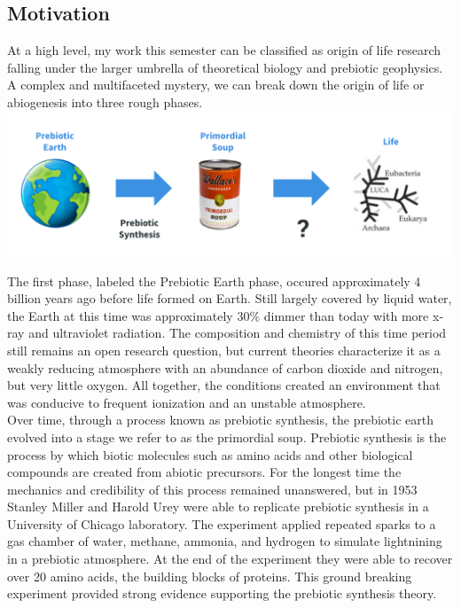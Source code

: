 \documentclass[11pt]{article}
\begin{document}
\subsection{Motivation}


At a high level, my work this semester can be classified as origin of life research  falling under the larger umbrella of theoretical biology and prebiotic geophysics.
A complex and multifaceted mystery, we can break down the origin of life or abiogenesis into three rough phases. \\

\includegraphics[width=\textwidth]{origin_of_life}

The first phase, labeled the Prebiotic Earth phase, occured approximately 4 billion years ago before life formed on Earth.
Still largely covered by liquid water, the Earth at this time was approximately 30\% dimmer than today with more x-ray and ultraviolet radiation.
The composition and chemistry of this time period still remains an open research question, but current theories characterize it as a weakly reducing atmosphere with an abundance of carbon dioxide and nitrogen, but very little oxygen.
All together, the conditions created an environment that was conducive to frequent ionization and an unstable atmosphere. \\

Over time, through a process known as prebiotic synthesis, the prebiotic earth evolved into a stage we refer to as the primordial soup. Prebiotic synthesis is the process by which biotic molecules such as amino acids and other biological compounds are created from abiotic precursors.
For the longest time the mechanics and credibility of this process remained unanswered, but in 1953 Stanley Miller and Harold Urey were able to replicate prebiotic synthesis in a University of Chicago laboratory.
The experiment applied repeated sparks to a gas chamber of water, methane, ammonia, and hydrogen to simulate lightnining in a prebiotic atmosphere. 
At the end of the experiment they were able to recover over 20 amino acids, the building blocks of proteins. 
This ground breaking experiment provided strong evidence supporting the prebiotic synthesis theory. \\
\end{document}

